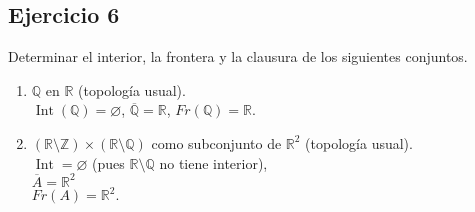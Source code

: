 \documentclass[12pt]{article}
\begin{document}
\subsection*{Ejercicio 6}
Determinar el interior, la frontera y la clausura de los siguientes conjuntos.

\begin{enumerate}
\item $\mathbb{Q}$ en $\mathbb{R}$ (topología usual).\\[4pt]
$\operatorname{Int}(\mathbb{Q}) = \varnothing$, \quad 
$\overline{\mathbb{Q}} = \mathbb{R}$, \quad 
$Fr(\mathbb{Q}) = \mathbb{R}$.

\item $(\mathbb{R}\setminus\mathbb{Z}) \times (\mathbb{R}\setminus\mathbb{Q})$ 
como subconjunto de $\mathbb{R}^2$ (topología usual).\\[4pt]
$\operatorname{Int} = \varnothing$ (pues $\mathbb{R}\setminus\mathbb{Q}$ no tiene interior),\\
$\overline{A} = \mathbb{R}^2$ \\
$Fr(A) = \mathbb{R}^2.$
\end{enumerate}
\end{document}
